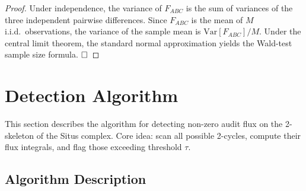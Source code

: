 \documentclass[12pt,a4paper]{article}
\theoremstyle{plain}
\theoremstyle{definition}
\theoremstyle{remark}
\newcommand{\Var}{\mathrm{Var}}
\begin{document}
\begin{proof}
Under independence, the variance of $F_{ABC}$ is the sum of variances of the three independent pairwise differences. Since $F_{ABC}$ is the mean of $M$ i.i.d.\ observations, the variance of the sample mean is $\Var[F_{ABC}]/M$. Under the central limit theorem, the standard normal approximation yields the Wald-test sample size formula. $\hfill\square$
\end{proof}

\section{Detection Algorithm}
\label{sec:algorithm}

This section describes the algorithm for detecting non-zero audit flux on the 2-skeleton of the Situs complex. Core idea: scan all possible 2-cycles, compute their flux integrals, and flag those exceeding threshold $\tau$.

\subsection{Algorithm Description}
\label{sec:algo_desc}
\end{document}
